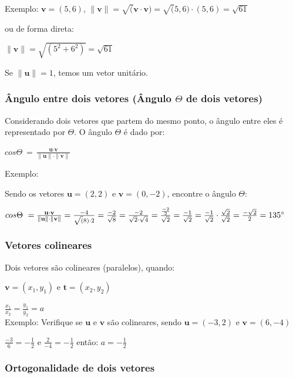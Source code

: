 \documentclass[12pt]{article}
\begin{document}
Exemplo: \(\textbf{v} = (5, 6)\), \(\|\textbf{v}\| = \sqrt(\textbf{v} \cdot \textbf{v}) = \sqrt(5,6) \cdot (5,6) = \sqrt{61}\)

ou de forma direta:

\(\|\textbf{v}\| = \sqrt{(5^2+6^2)} = \sqrt{61}\)


Se \(\|\textbf{u}\| = 1\), temos um vetor unitário.

\subsubsection{Ângulo entre dois vetores (Ângulo $\Theta$ de dois vetores)}

Considerando dois vetores que partem do mesmo ponto, o ângulo entre eles é representado por $\Theta$. O ângulo $\Theta$ é dado por:

\(cos \Theta\ = \frac{\textbf{u}  \cdot  \textbf{v}}{\|\textbf{u}\| \cdot \|\textbf{v}\|}\)

Exemplo:

Sendo os vetores \(\textbf{u} = (2,2)\) e \(\textbf{v}=(0, -2)\), encontre o ângulo $\Theta$:

\(cos \Theta\ = \frac{\textbf{u}  \cdot  \textbf{v}}{\|\textbf{u}\| \cdot \|\textbf{v}\|} = \frac{-4}{\sqrt(8) \cdot 2} = \frac{-2}{\sqrt{8}}=\frac{-2}{\sqrt{2} \cdot \sqrt{4}}=\frac{\frac{-2}{2}}{\sqrt{2}} = \frac{-1}{\sqrt{2}} = \frac{-1}{\sqrt{2}}  \cdot  \frac{\sqrt{2}}{\sqrt{2}} = \frac{-\sqrt{2}}{2} = 135\degree\)

\subsubsection{Vetores colineares}

Dois vetores são colineares (paralelos), quando:

\(\textbf{v} = (x_{1}, y_{1})\) e \(\textbf{t} = (x_{2}, y_{2})\)

\(\frac{x_{1}}{x_{2}} = \frac{y_{1}}{y_{2}} = \textit{a}\)
\\

Exemplo: Verifique se \(\textbf{u}\) e \(\textbf{v}\) são colineares, sendo \(\textbf{u} = (-3, 2)\) e \(\textbf{v}=(6,-4)\)

\(\frac{-3}{6} = -\frac{1}{2}\) e \(\frac{2}{-4} = -\frac{1}{2}\) então: \(\textit{a} = -\frac{1}{2}\)

\subsubsection{Ortogonalidade de dois vetores}
\end{document}
